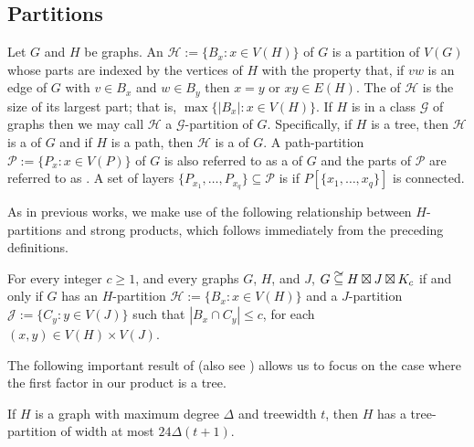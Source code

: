 \documentclass{patmorin}
\newcommand\subsetcong{\mathrel{\text{%
    \setbox0\hbox{$\subseteq$}%
    \rlap{\hbox to \wd0{\hss\hss\hss\raisebox{1.5\height}{$\sim$}\hss}}\box0
}}}
\renewcommand{\le}{\leqslant}
\renewcommand{\ge}{\geqslant}
\begin{document}
\subsection{Partitions}

Let $G$ and $H$ be graphs.  An  $\mathcal{H}:=\{B_x:x\in V(H)\}$ of $G$ is a partition of $V(G)$ whose parts are indexed by the vertices of $H$ with the property that, if $vw$ is an edge of $G$ with $v\in B_x$ and $w\in B_y$ then $x=y$ or $xy\in E(H)$.  The  of $\mathcal{H}$ is the size of its largest part; that is, $\max\{|B_x|:x\in V(H)\}$.
If $H$ is in a class $\mathcal{G}$ of graphs then we may call $\mathcal{H}$ a $\mathcal{G}$-partition of $G$.  Specifically, if $H$ is a tree, then $\mathcal{H}$ is a  of $G$ and if $H$ is a path, then $\mathcal{H}$ is a  of $G$.  A path-partition $\mathcal{P}:=\{P_x:x\in V(P)\}$ of $G$ is also referred to as a  of $G$ and the parts of $\mathcal{P}$ are referred to as .  A set of layers $\{P_{x_1},\ldots,P_{x_q}\}\subseteq\mathcal{P}$ is  if $P[\{x_1,\ldots,x_q\}]$ is connected.

As in previous works, we make use of the following relationship between $H$-partitions and strong products, which follows immediately from the preceding definitions.

\begin{obs}\label{partitions_vs_products}
  For every integer $c\ge 1$, and every graphs $G$, $H$, and $J$,  $G\subsetcong H\boxtimes J\boxtimes K_c$ if and only if $G$ has an $H$-partition $\mathcal{H}:=\{B_x:x\in V(H)\}$ and a $J$-partition $\mathcal{J}:=\{C_y:y\in V(J)\}$ such that $|B_x\cap C_y|\le c$, for each $(x,y)\in V(H)\times V(J)$.
\end{obs}

The following important result of \citet{ding.oporowski:some} (also see \cite{wood:on,distel.wood:tree_partitions}) allows us to focus on the case where the first factor in our product is a tree.

\begin{thm}\label{dingy}
  If $H$ is a graph with maximum degree $\Delta$ and treewidth $t$,
  then $H$ has a tree-partition of width at most $24\Delta(t+1)$.
\end{thm}
\end{document}
